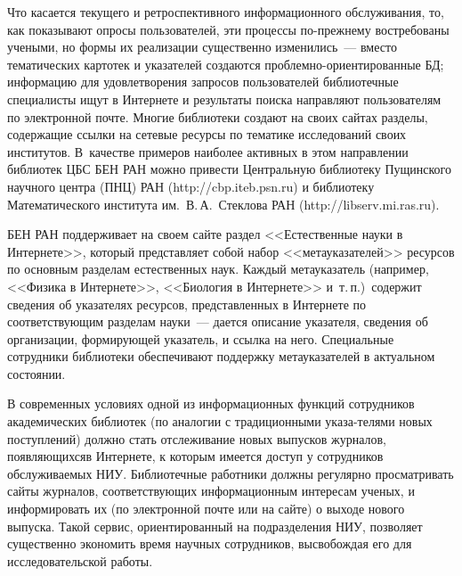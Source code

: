 \begin{multicols}{2}
   Что касается текущего и ретроспективного информационного обслуживания, то, как 
показывают опросы пользователей, эти процессы по-прежнему востребованы учеными, но 
формы их реализации %
 существенно изменились~--- вместо тематических картотек и 
указателей создаются проб\-лем\-но-ориен\-ти\-ро\-ван\-ные БД; информацию 
для удовле\-тво\-ре\-ния запросов пользователей библиотечные специалисты ищут в 
Интернете и результаты поиска на\-прав\-ля\-ют пользователям по электронной почте. 
Многие 
библиотеки создают на своих сайтах разделы, содержащие ссылки на сетевые ресурсы по 
тематике исследований своих институтов. В~качестве примеров наиболее активных в 
этом направлении библиотек ЦБС БЕН РАН можно привести Цент\-раль\-ную библиотеку 
Пущинского научного цент\-ра (ПНЦ) РАН ({\sf http://cbp.iteb.psn.ru}) и библиотеку 
Математического института им.\ В.\,А.~Стеклова РАН ({\sf http://libserv.mi.ras.ru}). 
   
   БЕН РАН поддерживает на своем сайте раздел <<Естественные науки в Интернете>>, 
который представляет собой набор <<метауказателей>> ресурсов по основным разделам 
естественных наук. Каждый метауказатель (например, <<Физика в Интернете>>, 
<<Биология в Интернете>> и~т.\,п.)\ содержит сведения об указателях ресурсов, 
представленных в Интернете по соответствующим разделам науки~--- дается описание 
указателя, сведения об организации, формирующей указатель, и ссылка на него. 
Специальные сотрудники библиотеки обеспечивают поддержку метауказателей в 
актуальном состоянии.

   
   В современных условиях одной из информационных функций сотрудников 
академических\linebreak
 биб\-лио\-тек (по аналогии с традиционными указа-\linebreak телями новых 
поступлений) должно стать от\-сле\-живание новых выпусков журналов, появляющихся\linebreak в 
Интернете, к которым имеется доступ у со\-труд\-ников обслуживаемых НИУ. Библиотечные 
ра\-ботники должны регулярно просматривать сайты\linebreak
 журналов, соответствующих 
информационным интересам ученых, и информировать их (по электронной почте или на 
сайте) о выходе нового выпуска. Такой сервис, ориентированный на подразделения НИУ, 
позволяет существенно экономить время научных сотрудников, высвобождая его для 
исследовательской работы. 
   

\end{multicols}
